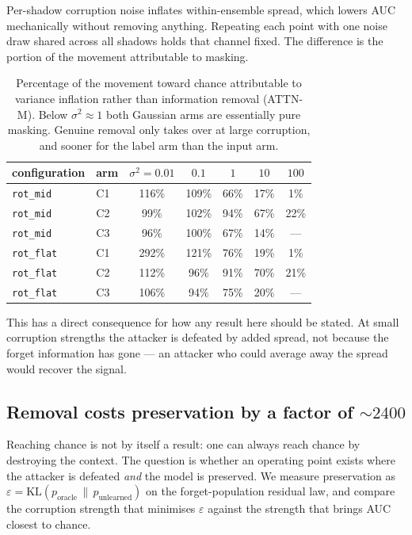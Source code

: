 \documentclass[11pt,a4paper]{article}
\newcommand{\vs}{\sigma^2}
\begin{document}
Per-shadow corruption noise inflates within-ensemble spread, which lowers AUC
mechanically without removing anything. Repeating each point with one noise draw
shared across all shadows holds that channel fixed. The difference is the
portion of the movement attributable to masking.


\begin{table}[h]\centering\small
\begin{tabular}{llccccc}
\toprule
configuration & arm & $\vs{=}0.01$ & $0.1$ & $1$ & $10$ & $100$ \\
\midrule
\texttt{rot\_mid} & C1 & 116\% & 109\% & 66\% & 17\% & 1\% \\
\texttt{rot\_mid} & C2 & 99\% & 102\% & 94\% & 67\% & 22\% \\
\texttt{rot\_mid} & C3 & 96\% & 100\% & 67\% & 14\% & --- \\
\texttt{rot\_flat} & C1 & 292\% & 121\% & 76\% & 19\% & 1\% \\
\texttt{rot\_flat} & C2 & 112\% & 96\% & 91\% & 70\% & 21\% \\
\texttt{rot\_flat} & C3 & 106\% & 94\% & 75\% & 20\% & --- \\
\bottomrule
\end{tabular}
\caption{Percentage of the movement toward chance attributable to variance
inflation rather than information removal (ATTN-M). Below $\vs\approx1$ both
Gaussian arms are essentially pure masking. Genuine removal only takes over at
large corruption, and sooner for the label arm than the input arm.}
\end{table}

This has a direct consequence for how any result here should be stated. At small
corruption strengths the attacker is defeated by added spread, not because the
forget information has gone --- an attacker who could average away the spread
would recover the signal.


\subsection{Removal costs preservation by a factor of ${\sim}2400$}

Reaching chance is not by itself a result: one can always reach chance by
destroying the context. The question is whether an operating point exists where
the attacker is defeated \emph{and} the model is preserved. We measure
preservation as $\varepsilon = \mathrm{KL}(p_{\text{oracle}}\,\|\,p_{\text{unlearned}})$
on the forget-population residual law, and compare the corruption strength that
minimises $\varepsilon$ against the strength that brings AUC closest to chance.
\end{document}
